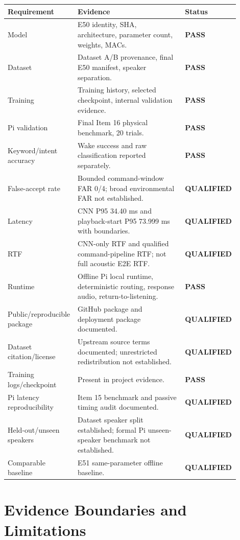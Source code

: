 \documentclass[11pt]{article}
\newcommand{\statuspass}{\textbf{PASS}}
\newcommand{\statusqualified}{\textbf{QUALIFIED}}
\begin{document}
\begin{longtable}{p{0.26\linewidth}p{0.46\linewidth}p{0.18\linewidth}}
\toprule
\textbf{Requirement} & \textbf{Evidence} & \textbf{Status} \\
\midrule
Model & E50 identity, SHA, architecture, parameter count, weights, MACs. & \statuspass \\
Dataset & Dataset A/B provenance, final E50 manifest, speaker separation. & \statuspass \\
Training & Training history, selected checkpoint, internal validation evidence. & \statuspass \\
Pi validation & Final Item 16 physical benchmark, 20 trials. & \statuspass \\
Keyword/intent accuracy & Wake success and raw classification reported separately. & \statuspass \\
False-accept rate & Bounded command-window FAR 0/4; broad environmental FAR not established. & \statusqualified \\
Latency & CNN P95 34.40 ms and playback-start P95 73.999 ms with boundaries. & \statusqualified \\
RTF & CNN-only RTF and qualified command-pipeline RTF; not full acoustic E2E RTF. & \statusqualified \\
Runtime & Offline Pi local runtime, deterministic routing, response audio, return-to-listening. & \statuspass \\
Public/reproducible package & GitHub package and deployment package documented. & \statusqualified \\
Dataset citation/license & Upstream source terms documented; unrestricted redistribution not established. & \statusqualified \\
Training logs/checkpoint & Present in project evidence. & \statuspass \\
Pi latency reproducibility & Item 15 benchmark and passive timing audit documented. & \statusqualified \\
Held-out/unseen speakers & Dataset speaker split established; formal Pi unseen-speaker benchmark not established. & \statusqualified \\
Comparable baseline & E51 same-parameter offline baseline. & \statusqualified \\
\bottomrule
\end{longtable}
\newpage
\section{Evidence Boundaries and Limitations}
\end{document}

